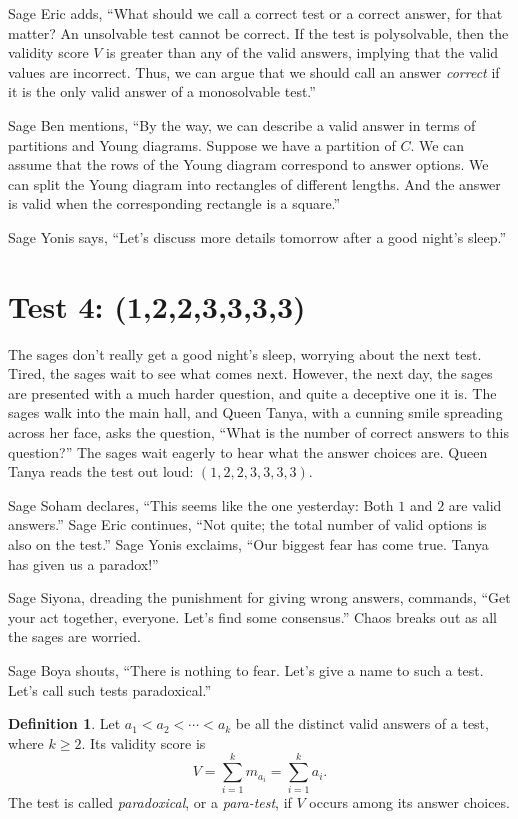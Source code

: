 \documentclass[12pt,reqno]{article}
\theoremstyle{plain}
\theoremstyle{definition}
\newtheorem{definition}{Definition}
\theoremstyle{remark}
\begin{document}
Sage Eric adds, ``What should we call a correct test or a correct answer, for that matter? An unsolvable test cannot be correct. If the test is polysolvable, then the validity score $V$ is greater than any of the valid answers, implying that the valid values are incorrect. Thus, we can argue that we should call an answer \textit{correct} if it is the only valid answer of a monosolvable test.''

Sage Ben mentions, ``By the way, we can describe a valid answer in terms of partitions and Young diagrams. Suppose we have a partition of $C$. We can assume that the rows of the Young diagram correspond to answer options. We can split the Young diagram into rectangles of different lengths. And the answer is valid when the corresponding rectangle is a square.''

Sage Yonis says, ``Let's discuss more details tomorrow after a good night's sleep.''

\section{Test 4: (1,2,2,3,3,3,3)}

The sages don't really get a good night's sleep, worrying about the next test. Tired, the sages wait to see what comes next. However, the next day, the sages are presented with a much harder question, and quite a deceptive one it is. The sages walk into the main hall, and Queen Tanya, with a cunning smile spreading across her face, asks the question, ``What is the number of correct answers to this question?'' The sages wait eagerly to hear what the answer choices are. Queen Tanya reads the test out loud: $(1,2,2,3,3,3,3)$.

Sage Soham declares, ``This seems like the one yesterday: Both $1$ and $2$ are valid answers.'' Sage Eric continues, ``Not quite; the total number of valid options is also on the test.'' Sage Yonis exclaims, ``Our biggest fear has come true. Tanya has given us a paradox!''

Sage Siyona, dreading the punishment for giving wrong answers, commands, ``Get your act together, everyone. Let's find some consensus.'' Chaos breaks out as all the sages are worried. 

Sage Boya shouts, ``There is nothing to fear. Let's give a name to such a test. Let's call such tests paradoxical.''

\begin{definition}
Let $a_1<a_2<\cdots<a_k$ be all the distinct valid answers of a test, where $k\geq 2$. Its validity score is
\[
V=\sum_{i=1}^k m_{a_i}=\sum_{i=1}^k a_i.
\]
The test is called \emph{paradoxical}, or a \emph{para-test}, if $V$ occurs among its answer choices.
\end{definition}
\end{document}
